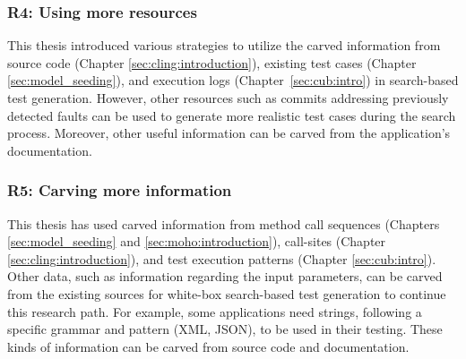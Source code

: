 \subsubsection{R4: Using more resources}
This thesis introduced various strategies to utilize the carved information from source code (\eg Chapter \ref{sec:cling:introduction}), existing test cases (\eg Chapter \ref{sec:model_seeding}), and execution logs (Chapter~\ref{sec:cub:intro}) in search-based test generation. However, other resources such as commits addressing previously detected faults can be used to generate more realistic test cases during the search process. Moreover, other useful information can be carved from the application's documentation.

\subsubsection{R5: Carving more information}
This thesis has used carved information from method call sequences (\eg Chapters \ref{sec:model_seeding} and \ref{sec:moho:introduction}), call-sites (Chapter \ref{sec:cling:introduction}), and test execution patterns (Chapter \ref{sec:cub:intro}). Other data, such as information regarding the input parameters, can be carved from the existing sources for white-box search-based test generation to continue this research path. For example, some applications need strings, following a specific grammar and pattern (\eg XML, JSON), to be used in their testing. These kinds of information can be carved from source code and documentation.